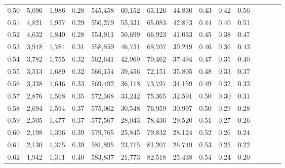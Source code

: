 \begin{tabular}{rrrcrrrrrrrrrrr}
0.50 &   5,096 &  1,986 &                                       0.28 &  545,458 &   60,152 &   63,126 &   44,830 &  0.43 &  0.42 &                         0.56 \\
0.51 &   4,821 &  1,957 &                                       0.29 &  550,279 &   55,331 &   65,083 &   42,873 &  0.44 &  0.40 &                         0.51 \\
0.52 &   4,632 &  1,840 &                                       0.28 &  554,911 &   50,699 &   66,923 &   41,033 &  0.45 &  0.38 &                         0.47 \\
0.53 &   3,948 &  1,784 &                                       0.31 &  558,859 &   46,751 &   68,707 &   39,249 &  0.46 &  0.36 &                         0.43 \\
0.54 &   3,782 &  1,755 &                                       0.32 &  562,641 &   42,969 &   70,462 &   37,494 &  0.47 &  0.35 &                         0.40 \\
0.55 &   3,513 &  1,689 &                                       0.32 &  566,154 &   39,456 &   72,151 &   35,805 &  0.48 &  0.33 &                         0.37 \\
0.56 &   3,338 &  1,646 &                                       0.33 &  569,492 &   36,118 &   73,797 &   34,159 &  0.49 &  0.32 &                         0.33 \\
0.57 &   2,876 &  1,568 &                                       0.35 &  572,368 &   33,242 &   75,365 &   32,591 &  0.50 &  0.30 &                         0.31 \\
0.58 &   2,694 &  1,594 &                                       0.37 &  575,062 &   30,548 &   76,959 &   30,997 &  0.50 &  0.29 &                         0.28 \\
0.59 &   2,505 &  1,477 &                                       0.37 &  577,567 &   28,043 &   78,436 &   29,520 &  0.51 &  0.27 &                         0.26 \\
0.60 &   2,198 &  1,396 &                                       0.39 &  579,765 &   25,845 &   79,832 &   28,124 &  0.52 &  0.26 &                         0.24 \\
0.61 &   2,130 &  1,375 &                                       0.39 &  581,895 &   23,715 &   81,207 &   26,749 &  0.53 &  0.25 &                         0.22 \\
0.62 &   1,942 &  1,311 &                                       0.40 &  583,837 &   21,773 &   82,518 &   25,438 &  0.54 &  0.24 &                         0.20 \\

\end{tabular}
